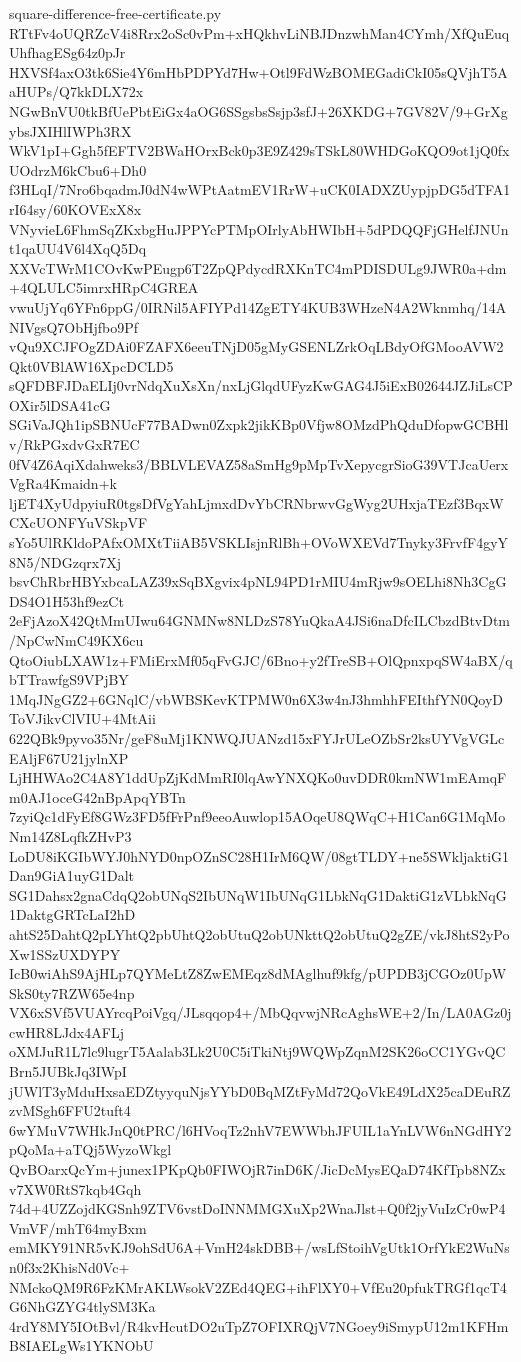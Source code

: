 \documentclass[11pt]{article}
\theoremstyle{definition}
\theoremstyle{remark}
\begin{document}
\begin{filecontents*}[overwrite]{square-difference-free-certificate.py}
RTtFv4oUQRZcV4i8Rrx2oSc0vPm+xHQkhvLiNBJDnzwhMan4CYmh/XfQuEuqUhfhagESg64z0pJr
HXVSf4axO3tk6Sie4Y6mHbPDPYd7Hw+Otl9FdWzBOMEGadiCkI05sQVjhT5AaHUPs/Q7kkDLX72x
NGwBnVU0tkBfUePbtEiGx4aOG6SSgsbsSsjp3sfJ+26XKDG+7GV82V/9+GrXgybsJXIHlIWPh3RX
WkV1pI+Ggh5fEFTV2BWaHOrxBck0p3E9Z429sTSkL80WHDGoKQO9ot1jQ0fxUOdrzM6kCbu6+Dh0
f3HLqI/7Nro6bqadmJ0dN4wWPtAatmEV1RrW+uCK0IADXZUypjpDG5dTFA1rI64sy/60KOVExX8x
VNyvieL6FhmSqZKxbgHuJPPYcPTMpOIrlyAbHWIbH+5dPDQQFjGHelfJNUnt1qaUU4V6l4XqQ5Dq
XXVcTWrM1COvKwPEugp6T2ZpQPdycdRXKnTC4mPDISDULg9JWR0a+dm+4QLULC5imrxHRpC4GREA
vwuUjYq6YFn6ppG/0IRNil5AFIYPd14ZgETY4KUB3WHzeN4A2Wknmhq/14ANIVgsQ7ObHjfbo9Pf
vQu9XCJFOgZDAi0FZAFX6eeuTNjD05gMyGSENLZrkOqLBdyOfGMooAVW2Qkt0VBlAW16XpcDCLD5
sQFDBFJDaELIj0vrNdqXuXsXn/nxLjGlqdUFyzKwGAG4J5iExB02644JZJiLsCPOXir5lDSA41cG
SGiVaJQh1ipSBNUcF77BADwn0Zxpk2jikKBp0Vfjw8OMzdPhQduDfopwGCBHlv/RkPGxdvGxR7EC
0fV4Z6AqiXdahweks3/BBLVLEVAZ58aSmHg9pMpTvXepycgrSioG39VTJcaUerxVgRa4Kmaidn+k
ljET4XyUdpyiuR0tgsDfVgYahLjmxdDvYbCRNbrwvGgWyg2UHxjaTEzf3BqxWCXcUONFYuVSkpVF
sYo5UlRKldoPAfxOMXtTiiAB5VSKLIsjnRlBh+OVoWXEVd7Tnyky3FrvfF4gyY8N5/NDGzqrx7Xj
bsvChRbrHBYxbcaLAZ39xSqBXgvix4pNL94PD1rMIU4mRjw9sOELhi8Nh3CgGDS4O1H53hf9ezCt
2eFjAzoX42QtMmUIwu64GNMNw8NLDzS78YuQkaA4JSi6naDfcILCbzdBtvDtm/NpCwNmC49KX6cu
QtoOiubLXAW1z+FMiErxMf05qFvGJC/6Bno+y2fTreSB+OlQpnxpqSW4aBX/qbTTrawfgS9VPjBY
1MqJNgGZ2+6GNqlC/vbWBSKevKTPMW0n6X3w4nJ3hmhhFEIthfYN0QoyDToVJikvClVIU+4MtAii
622QBk9pyvo35Nr/geF8uMj1KNWQJUANzd15xFYJrULeOZbSr2ksUYVgVGLcEAljF67U21jylnXP
LjHHWAo2C4A8Y1ddUpZjKdMmRI0lqAwYNXQKo0uvDDR0kmNW1mEAmqFm0AJ1oceG42nBpApqYBTn
7zyiQc1dFyEf8GWz3FD5fFrPnf9eeoAuwlop15AOqeU8QWqC+H1Can6G1MqMoNm14Z8LqfkZHvP3
LoDU8iKGIbWYJ0hNYD0npOZnSC28H1IrM6QW/08gtTLDY+ne5SWkljaktiG1Dan9GiA1uyG1Dalt
SG1Dahsx2gnaCdqQ2obUNqS2IbUNqW1IbUNqG1LbkNqG1DaktiG1zVLbkNqG1DaktgGRTcLaI2hD
ahtS25DahtQ2pLYhtQ2pbUhtQ2obUtuQ2obUNkttQ2obUtuQ2gZE/vkJ8htS2yPoXw1SSzUXDYPY
IcB0wiAhS9AjHLp7QYMeLtZ8ZwEMEqz8dMAglhuf9kfg/pUPDB3jCGOz0UpWSkS0ty7RZW65e4np
VX6xSVf5VUAYrcqPoiVgq/JLsqqop4+/MbQqvwjNRcAghsWE+2/In/LA0AGz0jcwHR8LJdx4AFLj
oXMJuR1L7lc9lugrT5Aalab3Lk2U0C5iTkiNtj9WQWpZqnM2SK26oCC1YGvQCBrn5JUBkJq3IWpI
jUWlT3yMduHxsaEDZtyyquNjsYYbD0BqMZtFyMd72QoVkE49LdX25caDEuRZzvMSgh6FFU2tuft4
6wYMuV7WHkJnQ0tPRC/l6HVoqTz2nhV7EWWbhJFUIL1aYnLVW6nNGdHY2pQoMa+aTQj5WyzoWkgl
QvBOarxQcYm+junex1PKpQb0FIWOjR7inD6K/JicDcMysEQaD74KfTpb8NZxv7XW0RtS7kqb4Gqh
74d+4UZZojdKGSnh9ZTV6vstDoINNMMGXuXp2WnaJlst+Q0f2jyVuIzCr0wP4VmVF/mhT64myBxm
emMKY91NR5vKJ9ohSdU6A+VmH24skDBB+/wsLfStoihVgUtk1OrfYkE2WuNsn0f3x2KhisNd0Vc+
NMckoQM9R6FzKMrAKLWsokV2ZEd4QEG+ihFlXY0+VfEu20pfukTRGf1qcT4G6NhGZYG4tlySM3Ka
4rdY8MY5IOtBvl/R4kvHcutDO2uTpZ7OFIXRQjV7NGoey9iSmypU12m1KFHmB8IAELgWs1YKNObU

\end{filecontents*}
\end{document}

